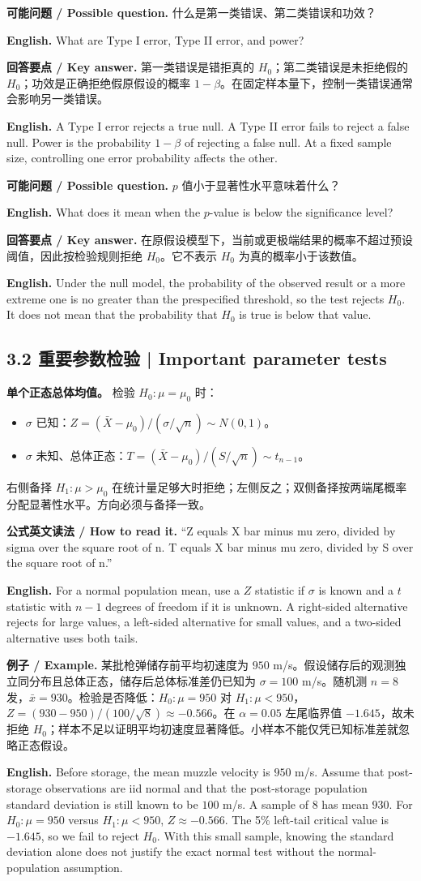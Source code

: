 \documentclass[UTF8,11pt,a4paper]{ctexart}
\newcommand{\EN}[1]{\par\noindent\textbf{English.} #1\par}
\newcommand{\READ}[1]{\par\noindent\textbf{公式英文读法 / How to read it.} #1\par}
\newcommand{\EX}[2]{\par\noindent\textbf{例子 / Example.} #1\par\EN{#2}}
\newcommand{\ASK}[4]{\par\noindent\textbf{可能问题 / Possible question.} #1\par\EN{#2}\noindent\textbf{回答要点 / Key answer.} #3\par\EN{#4}\medskip}
\begin{document}
\ASK{什么是第一类错误、第二类错误和功效？}{What are Type I error, Type II error, and power?}{第一类错误是错拒真的 $H_0$；第二类错误是未拒绝假的 $H_0$；功效是正确拒绝假原假设的概率 $1-\beta$。在固定样本量下，控制一类错误通常会影响另一类错误。}{A Type I error rejects a true null. A Type II error fails to reject a false null. Power is the probability $1-\beta$ of rejecting a false null. At a fixed sample size, controlling one error probability affects the other.}

\ASK{$p$ 值小于显著性水平意味着什么？}{What does it mean when the $p$-value is below the significance level?}{在原假设模型下，当前或更极端结果的概率不超过预设阈值，因此按检验规则拒绝 $H_0$。它不表示 $H_0$ 为真的概率小于该数值。}{Under the null model, the probability of the observed result or a more extreme one is no greater than the prespecified threshold, so the test rejects $H_0$. It does not mean that the probability that $H_0$ is true is below that value.}

\subsection*{3.2 重要参数检验 | Important parameter tests}
\noindent\textbf{单个正态总体均值。} 检验 $H_0:\mu=\mu_0$ 时：
\begin{itemize}
\item $\sigma$ 已知：$Z=(\bar X-\mu_0)/(\sigma/\sqrt n)\sim N(0,1)$。
\item $\sigma$ 未知、总体正态：$T=(\bar X-\mu_0)/(S/\sqrt n)\sim t_{n-1}$。
\end{itemize}
右侧备择 $H_1:\mu>\mu_0$ 在统计量足够大时拒绝；左侧反之；双侧备择按两端尾概率分配显著性水平。方向必须与备择一致。
\READ{“Z equals X bar minus mu zero, divided by sigma over the square root of n. T equals X bar minus mu zero, divided by S over the square root of n.”}
\EN{For a normal population mean, use a $Z$ statistic if $\sigma$ is known and a $t$ statistic with $n-1$ degrees of freedom if it is unknown. A right-sided alternative rejects for large values, a left-sided alternative for small values, and a two-sided alternative uses both tails.}

\EX{某批枪弹储存前平均初速度为 $950$ m/s。假设储存后的观测独立同分布且总体正态，储存后总体标准差仍已知为 $\sigma=100$ m/s。随机测 $n=8$ 发，$\bar x=930$。检验是否降低：$H_0:\mu=950$ 对 $H_1:\mu<950$，$Z=(930-950)/(100/\sqrt8)\approx-0.566$。在 $\alpha=0.05$ 左尾临界值 $-1.645$，故未拒绝 $H_0$；样本不足以证明平均初速度显著降低。小样本不能仅凭已知标准差就忽略正态假设。}{Before storage, the mean muzzle velocity is $950$ m/s. Assume that post-storage observations are iid normal and that the post-storage population standard deviation is still known to be $100$ m/s. A sample of $8$ has mean $930$. For $H_0:\mu=950$ versus $H_1:\mu<950$, $Z\approx-0.566$. The 5\% left-tail critical value is $-1.645$, so we fail to reject $H_0$. With this small sample, knowing the standard deviation alone does not justify the exact normal test without the normal-population assumption.}
\end{document}
